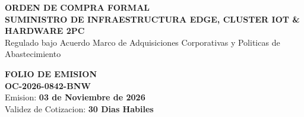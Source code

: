\documentclass[11pt,a4paper]{article}
\begin{document}

\drawchromaticbar[3.5pt]
\vspace{3mm}

\noindent
\begin{minipage}[t]{0.62\textwidth}
  {\fontsize{18}{22}\selectfont\bfseries\color{corpPrimary}ORDEN DE COMPRA FORMAL}\\[2pt]
  {\small\bfseries\color{corpTextAccent}SUMINISTRO DE INFRAESTRUCTURA EDGE, CLUSTER IOT \& HARDWARE 2PC}\\[3pt]
  {\footnotesize\color{corpTextMuted}Regulado bajo Acuerdo Marco de Adquisiciones Corporativas y Politicas de Abastecimiento}
\end{minipage}\hfill
\begin{minipage}[t]{0.35\textwidth}
  \raggedleft
  \begin{tcolorbox}[
    enhanced,
    colback=corpLightBg,
    colframe=corpBorder,
    arc=2mm,
    boxrule=0.7pt,
    top=2mm, bottom=2mm, left=3mm, right=3mm
  ]
    \raggedleft
    {\scriptsize\bfseries\color{corpTextMuted}FOLIO DE EMISION}\\[1pt]
    {\normalsize\bfseries\color{corpPrimary}OC-2026-0842-BNW}\\[2pt]
    {\scriptsize\color{corpTextDark}Emision: \textbf{03 de Noviembre de 2026}}\\[1pt]
    {\scriptsize\color{corpTextDark}Validez de Cotizacion: \textbf{30 Dias Habiles}}
  \end{tcolorbox}
\end{minipage}

\vspace{3mm}
\end{document}
